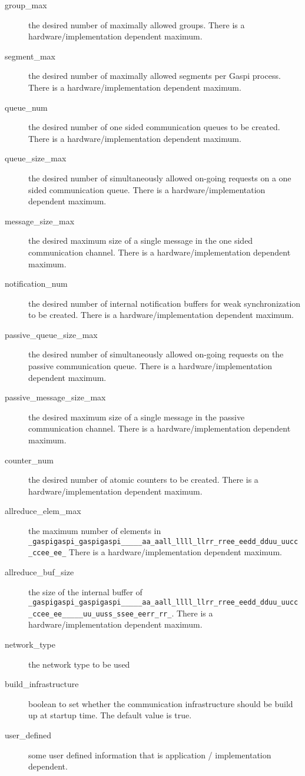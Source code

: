 \documentclass{article}
\makeatletter
\newlength{\st}\setlength{\st}{0pt}
\newcommand{\zerowsep}{\hskip 0pt plus 0.1pt minus 0.1pt}
\newcommand{\ZSEP}[1]{\ifx#1\@@@EOZ@@@\let\next\relax\else\ifx#1\_#1\zerowsep\else#1\fi\let\next\ZSEP\fi\next}
\newcommand{\zsep}[1]{\ZSEP{}#1\@@@EOZ@@@}
\newcommand{\gaspiprefix}{gaspi}
\newcommand{\GASPI}{{\sc Gaspi}}
\newcommand{\function}[1]{{\tt #1}}
\newcommand{\gaspifunction}[1]{\function{\protect\zsep{\gaspiprefix\_#1}}}
\makeatother
\begin{document}
\begin{description}
\item[group\_max] the desired number of maximally allowed groups. There is a hardware/implementation dependent maximum.
\item[segment\_max] the desired number of maximally allowed segments per \GASPI{} process.
There is a hardware/implementation dependent maximum.
\item[queue\_num] the desired number of one sided communication queues to be created. There is a hardware/implementation
dependent maximum.
\item[queue\_size\_max] the desired number of simultaneously allowed on-going requests on a one sided communication queue.
There is a hardware/implementation dependent maximum.
\item[message\_size\_max] the desired maximum size of a single message in the one sided communication channel.
There is a hardware/implementation dependent maximum.
\item[notification\_num] the desired number of internal notification buffers for weak synchronization to be created. 
There is a hardware/implementation dependent maximum.
\item[passive\_queue\_size\_max] the desired number of simultaneously allowed on-going requests on the
passive communication queue. There is a hardware/implementation dependent maximum.
\item[passive\_message\_size\_max] the desired maximum size of a single message in the passive communication channel.
There is a hardware/implementation dependent maximum.
\item[counter\_num] the desired number of atomic counters to be created.
There is a hardware/implementation dependent maximum.
\item[allreduce\_elem\_max] the maximum number of elements in \gaspifunction{allreduce}
There is a hardware/implementation dependent maximum.
\item[allreduce\_buf\_size] the size of the internal buffer of \gaspifunction{allreduce\_user}.
There is a hardware/implementation dependent maximum.
\item[network\_type] the network type to be used
\item[build\_infrastructure] boolean to set whether the communication infrastructure should
be build up at startup time. The default value is true.
\item[user\_defined] some user defined information that is application / implementation dependent.
\end{description}
\end{document}
